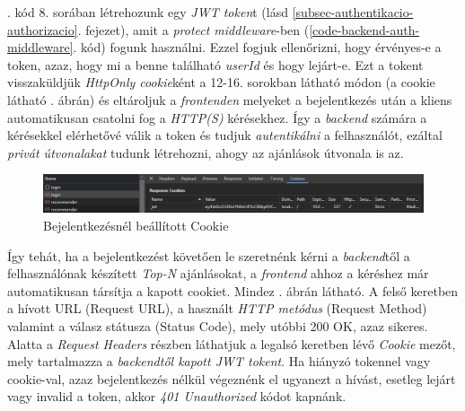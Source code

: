 \documentclass[
]{thesis-ekf}
\theoremstyle{definition}
\theoremstyle{remark}
\begin{document}


. kód 8. sorában létrehozunk egy \emph{JWT token}t (lásd \ref{subsec-authentikacio-authorizacio}. fejezet), amit a \emph{protect middleware}-ben (\ref{code-backend-auth-middleware}. kód) fogunk használni. Ezzel fogjuk ellenőrizni, hogy érvényes-e a token, azaz, hogy mi a benne található \emph{userId} és hogy lejárt-e. Ezt a tokent visszaküldjük \emph{HttpOnly cookie}ként a 12-16. sorokban látható módon (a cookie látható . ábrán) és eltároljuk a \emph{frontenden} melyeket a bejelentkezés után a kliens automatikusan csatolni fog a \emph{HTTP(S)} kérésekhez. Így a \emph{backend} számára a kérésekkel elérhetővé válik a token és tudjuk \emph{autentikálni} a felhasználót, ezáltal \emph{privát útvonalakat} tudunk létrehozni, ahogy az ajánlások útvonala is az.

\begin{figure}[H]
	\centering
	\includegraphics[width=14cm]{images/frontend-login-response-cookie.png}
	\caption[Bejelentkezésnél beállított Cookie]{Bejelentkezésnél beállított Cookie}
	\label{fig-sign-in-cookie}
\end{figure}

Így tehát, ha a bejelentkezést követően le szeretnénk kérni a \emph{backend}től a felhasználónak készített \emph{Top-N} ajánlásokat, a \emph{frontend} ahhoz a kéréshez már automatikusan társítja a kapott cookiet. Mindez . ábrán látható. A felső keretben a hívott URL (Request URL), a használt \emph{HTTP metódus} (Request Method) valamint a válasz státusza (Status Code), mely utóbbi 200 OK, azaz sikeres. Alatta a \emph{Request Headers} részben láthatjuk a legalsó keretben lévő \emph{Cookie} mezőt, mely tartalmazza a \emph{backendtől kapott JWT tokent}. Ha hiányzó tokennel vagy cookie-val, azaz bejelentkezés nélkül végeznénk el ugyanezt a hívást, esetleg lejárt vagy invalid a token, akkor \emph{401 Unauthorized} kódot kapnánk.
\end{document}
